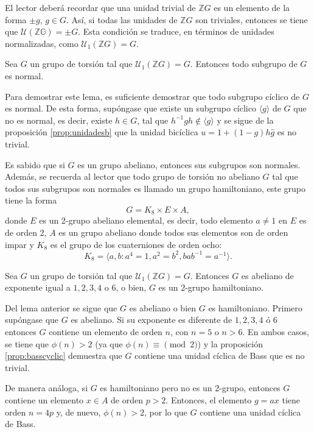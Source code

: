 El lector deberá recordar que una unidad trivial de $\mathds{Z}G$ es un elemento de la forma $\pm g$, $ g \in G$. Así, si todas las unidades de $\mathds{Z}G$ son triviales, entonces se tiene que $\mathcal{U}(\mathds{ZG}) = \pm G$. Esta condición se traduce, en términos de unidades normalizadas, como $\mathcal{U}_1(\mathds{Z}G) = G.$
\begin{lema}
Sea $G$ un grupo de torsión tal que $\mathcal{U}_1(\mathds{Z}G) = G.$ Entonces todo subgrupo de $G$ es normal. 
\end{lema}
\newpage
\begin{proof*}
Para demostrar este lema, es suficiente demostrar que todo subgrupo cíclico de $G$ es normal.  De esta forma, supóngase que existe un subgrupo cíclico $\langle g \rangle$ de $G$ que no es normal, es decir, existe $h \in G$, tal que $h^{-1}gh \notin \langle g \rangle$ y se sigue de la proposición \ref{prop:unidadesb} que la unidad bicíclica $u = 1 + (1-g)h\hat{g}$ es no trivial. 
\end{proof*}
Es sabido que si $G$ es un grupo abeliano, entonces sus subgrupos son normales. Además, se recuerda al lector que todo grupo de torsión no abeliano $G$ tal que todos sus subgrupos son normales es llamado un grupo hamiltoniano, este grupo tiene la forma \[ G = K_8\times E \times A,\] donde $E$ es un 2-grupo abeliano elemental, es decir, todo elemento $a \neq 1$ en $E$ es de orden 2, $A$ es un grupo abeliano donde todos sus elementos son de orden impar y $K_8$ es el grupo de los cuaterniones de orden ocho: \[ K_8 = \langle a,b \colon a^4 =1 , a^2 = b^2, bab^{-1} = a^{-1} \rangle. \]
\begin{proposicion}
Sea $G$ un grupo de torsión tal que $\mathcal{U}_1(\mathds{Z}G) = G$. Entonces $G$ es abeliano de exponente igual a $1,2,3,4$ o $6$, o bien, $G$ es un 2-grupo hamiltoniano.
\end{proposicion}
\begin{proof*}
Del lema anterior se sigue que $G$ es abeliano o bien  $G$ es hamiltoniano. Primero supóngase que $G$ es abeliano. Si su exponente es diferente de $1,2,3,4$ ó $6$ entonces $G$ contiene un elemento de orden $n$, con $n = 5$ o $n>6$. En ambos casos, se tiene que $\phi(n) > 2$ (ya que $\phi(n) \equiv \pmod{2}$)  y la proposición \ref{prop:basscyclic} demuestra que $G$ contiene una unidad cíclica de Bass que es no trivial.

De manera análoga, si $G$ es hamiltoniano pero no es un 2-grupo, entonces $G$ contiene un elemento $x \in A$ de orden $p>2$. Entonces, el elemento $g = ax$ tiene orden $n=4p$ y, de nuevo, $\phi(n) > 2$, por lo que $G$ contiene una unidad cíclica de Bass. 
\end{proof*}
